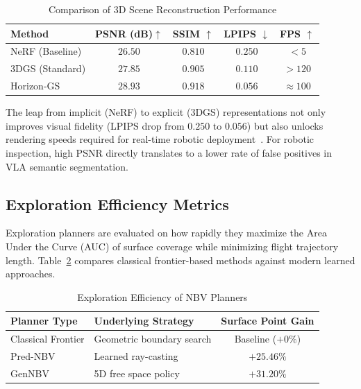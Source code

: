 \documentclass[conference]{IEEEtran}
\begin{document}
\begin{table}[htbp]
	\caption{Comparison of 3D Scene Reconstruction Performance}
	\label{tab:recon_quality}
	\begin{center}
		\begin{tabular}{lcccc}
			\toprule
			\textbf{Method} & \textbf{PSNR (dB)$\uparrow$} & \textbf{SSIM $\uparrow$} & \textbf{LPIPS $\downarrow$} & \textbf{FPS $\uparrow$} \\
			\midrule
			NeRF (Baseline) & $26.50$ & $0.810$ & $0.250$ & $< 5$ \\
			3DGS (Standard) & $27.85$ & $0.905$ & $0.110$ & $> 120$ \\
			Horizon-GS~\cite{lu2025horizongs} & $\mathbf{28.93}$ & $\mathbf{0.918}$ & $\mathbf{0.056}$ & $\approx 100$ \\
			\bottomrule
		\end{tabular}
	\end{center}
\end{table}

The leap from implicit (NeRF) to explicit (3DGS) representations not only improves visual fidelity (LPIPS drop from $0.250$ to $0.056$) but also unlocks rendering speeds required for real-time robotic deployment~\cite{atik2025comparative}. For robotic inspection, high PSNR directly translates to a lower rate of false positives in VLA semantic segmentation.

\subsection{Exploration Efficiency Metrics}
\label{subsec:exploration_metrics}

Exploration planners are evaluated on how rapidly they maximize the Area Under the Curve (AUC) of surface coverage while minimizing flight trajectory length. Table~\ref{tab:nbv_efficiency} compares classical frontier-based methods against modern learned approaches.

\begin{table}[htbp]
	\caption{Exploration Efficiency of NBV Planners}
	\label{tab:nbv_efficiency}
	\begin{center}
		\begin{tabular}{llc}
			\toprule
			\textbf{Planner Type} & \textbf{Underlying Strategy} & \textbf{Surface Point Gain} \\
			\midrule
			Classical Frontier & Geometric boundary search & Baseline ($+0\%$) \\
			Pred-NBV~\cite{dhami2023prednbv} & Learned ray-casting & $+25.46\%$ \\
			GenNBV~\cite{chen2024gennbv}   & 5D free space policy & $\mathbf{+31.20\%}$ \\
			\bottomrule
		\end{tabular}
	\end{center}
\end{table}
\end{document}
